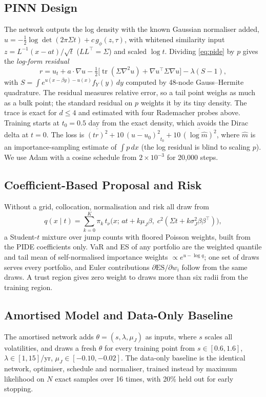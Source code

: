 \documentclass[conference]{IEEEtran}
\newcommand{\ES}{\mathrm{ES}}
\begin{document}
\subsection{PINN Design}
The network outputs the log density with the known Gaussian normaliser added,
$u = -\tfrac12\log\det(2\pi\Sigma t) + c\,g_\phi(z,\tau)$, with whitened similarity input
$z = L^{-1}(x - at)/\sqrt{t}$ ($LL^\top = \Sigma$) and scaled $\log t$. Dividing \eqref{eq:pide} by $p$ gives the
\emph{log-form residual}
\begin{equation}
  r = u_t + a\cdot\nabla u - \tfrac12\big[\operatorname{tr}(\Sigma\nabla^2 u) + \nabla u^\top\Sigma\nabla u\big]
      - \lambda (S-1),
\end{equation}
with $S = \int e^{u(x-\beta y)-u(x)} f_Y(y)\,dy$ computed by 48-node Gauss--Hermite quadrature. The residual measures
relative error, so a tail point weighs as much as a bulk point; the standard residual on $p$ weights it by its tiny
density. The trace is exact for $d \le 4$ and estimated with four Rademacher probes \cite{hutchinson1989} above.
Training starts at $t_0 = 0.5$ day from the exact density, which avoids the Dirac delta at $t = 0$. The loss is
$\overline{(t r)^2} + 10\,\overline{(u - u_0)^2}_{t_0} + 10\,\overline{(\log \hat m)^2}$, where $\hat m$ is an
importance-sampling estimate of $\int p\,dx$ (the log residual is blind to scaling $p$). We use Adam with a cosine
schedule from $2\times10^{-3}$ for 20{,}000 steps.

\subsection{Coefficient-Based Proposal and Risk}
Without a grid, collocation, normalisation and risk all draw from
\begin{equation}
  q(x\mid t) = \sum_{k=0}^{K}\pi_k\, t_\nu\!\big(x;\, at + k\mu_J\beta,\; c^2(\Sigma t + k\sigma_J^2\beta\beta^\top)\big),
\end{equation}
a Student-$t$ mixture over jump counts with floored Poisson weights, built from the PIDE coefficients only. VaR and
ES of any portfolio are the weighted quantile and tail mean of self-normalised importance weights
$\propto e^{u - \log q}$; one set of draws serves every portfolio, and Euler contributions $\partial\ES/\partial w_i$
follow from the same draws. A trust region gives zero weight to draws more than six radii from the training region.

\subsection{Amortised Model and Data-Only Baseline}
The amortised network adds $\theta = (s, \lambda, \mu_J)$ as inputs, where $s$ scales all volatilities, and draws a
fresh $\theta$ for every training point from $s\in[0.6,1.6]$, $\lambda\in[1,15]$/yr, $\mu_J\in[-0.10,-0.02]$. The
data-only baseline is the identical network, optimiser, schedule and normaliser, trained instead by maximum
likelihood on $N$ exact samples over 16 times, with 20\% held out for early stopping.
\end{document}

